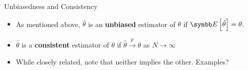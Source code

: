 \documentclass[aspectratio=169,11pt]{beamer}
\begin{document}













\begin{frame}{Unbiasedness and Consistency}
\begin{itemize}
	\item As mentioned above,
	 $\hat{\theta}$ is an {\bf unbiased} estimator of $\theta$ if $\E\left[\hat{\theta}\right] = \theta$.
	 
	 \medskip
	 \item  $\hat{\theta}$ is a {\bf consistent} estimator of $\theta$ if $\hat{\theta}\overset{p}{\rightarrow}\theta$
	 as $N\rightarrow \infty$
	
	\medskip
	\item While closely related, note that neither implies the other. Examples?
\end{itemize}
\end{frame}
\end{document}
